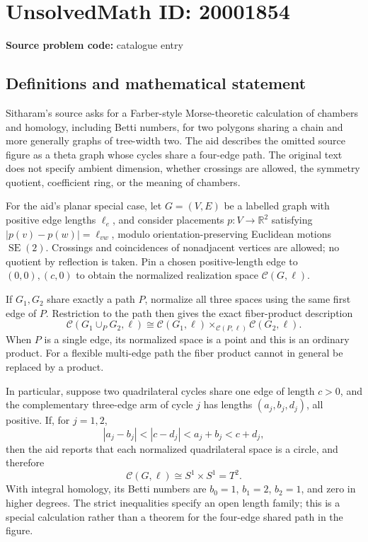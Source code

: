 \documentclass[11pt]{article}
\newcommand{\R}{\mathbb{R}}
\begin{document}
\section*{UnsolvedMath ID: 20001854}
\textbf{Source problem code:} catalogue entry
\subsection{Definitions and mathematical statement}
Sitharam's source asks for a Farber-style Morse-theoretic calculation of chambers and homology, including Betti numbers, for two polygons sharing a chain and more generally graphs of tree-width two. The aid describes the omitted source figure as a theta graph whose cycles share a four-edge path. The original text does not specify ambient dimension, whether crossings are allowed, the symmetry quotient, coefficient ring, or the meaning of chambers.

For the aid's planar special case, let \(G=(V,E)\) be a labelled graph with positive edge lengths \(\ell_e\), and consider placements \(p:V\to\R^2\) satisfying \(|p(v)-p(w)|=\ell_{vw}\), modulo orientation-preserving Euclidean motions \(\operatorname{SE}(2)\). Crossings and coincidences of nonadjacent vertices are allowed; no quotient by reflection is taken. Pin a chosen positive-length edge to \((0,0),(c,0)\) to obtain the normalized realization space \(\mathcal C(G,\ell)\).

If \(G_1,G_2\) share exactly a path \(P\), normalize all three spaces using the same first edge of \(P\). Restriction to the path then gives the exact fiber-product description
\[
 \mathcal C(G_1\cup_PG_2,\ell)
 \cong\mathcal C(G_1,\ell)\times_{\mathcal C(P,\ell)}
                           \mathcal C(G_2,\ell).
\]
When \(P\) is a single edge, its normalized space is a point and this is an ordinary product. For a flexible multi-edge path the fiber product cannot in general be replaced by a product.

In particular, suppose two quadrilateral cycles share one edge of length \(c>0\), and the complementary three-edge arm of cycle \(j\) has lengths \((a_j,b_j,d_j)\), all positive. If, for \(j=1,2\),
\[
 |a_j-b_j|<|c-d_j|<a_j+b_j<c+d_j,
\]
then the aid reports that each normalized quadrilateral space is a circle, and therefore
\[
 \mathcal C(G,\ell)\cong S^1\times S^1=T^2.
\]
With integral homology, its Betti numbers are \(b_0=1\), \(b_1=2\), \(b_2=1\), and zero in higher degrees. The strict inequalities specify an open length family; this is a special calculation rather than a theorem for the four-edge shared path in the figure.
\end{document}

